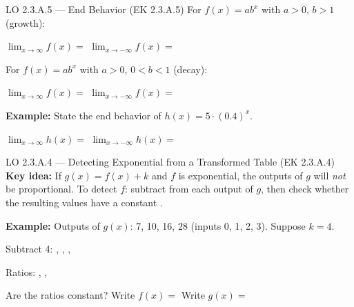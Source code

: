 \documentclass[10pt]{article}
\begin{document}
\vspace{0.04in}

\begin{notesbox}{LO 2.3.A.5 --- End Behavior (EK 2.3.A.5)}
For $f(x) = ab^x$ with $a > 0$, $b > 1$ (growth):

$\displaystyle\lim_{x \to \infty} f(x) = $ \ans{$\infty$} \qquad
$\displaystyle\lim_{x \to -\infty} f(x) = $ 

For $f(x) = ab^x$ with $a > 0$, $0 < b < 1$ (decay):

$\displaystyle\lim_{x \to \infty} f(x) = $  \qquad
$\displaystyle\lim_{x \to -\infty} f(x) = $ \ans{$\infty$}

\textbf{Example:} State the end behavior of $h(x) = 5 \cdot (0.4)^x$.

\vspace{0.04in}
$\displaystyle\lim_{x\to\infty} h(x) = $  \qquad
$\displaystyle\lim_{x\to-\infty} h(x) = $ \ans{$\infty$}
\end{notesbox}

\vspace{0.04in}

\begin{notesbox}{LO 2.3.A.4 --- Detecting Exponential from a Transformed Table (EK 2.3.A.4)}
\textbf{Key idea:} If $g(x) = f(x) + k$ and $f$ is exponential, the outputs of $g$ will
\textit{not} be proportional. To detect $f$: subtract  from each output of $g$,
then check whether the resulting values have a constant .

\medskip
\textbf{Example:} Outputs of $g(x)$: 7, 10, 16, 28 (inputs 0, 1, 2, 3). Suppose $k = 4$.

\vspace{0.04in}
Subtract 4: , , , 

Ratios: , , 

Are the ratios constant?  \quad Write $f(x) = $ 
\quad Write $g(x) = $ 
\end{notesbox}
\end{document}
